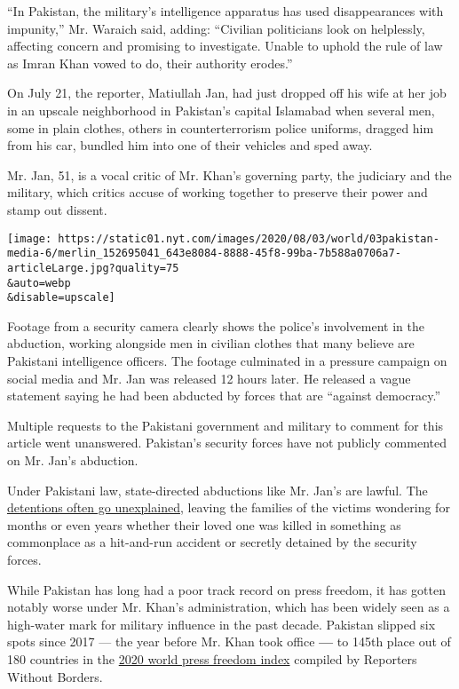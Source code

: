 ``In Pakistan, the military's intelligence apparatus has used
disappearances with impunity,'' Mr. Waraich said, adding: ``Civilian
politicians look on helplessly, affecting concern and promising to
investigate. Unable to uphold the rule of law as Imran Khan vowed to do,
their authority erodes.''

On July 21, the reporter, Matiullah Jan, had just dropped off his wife
at her job in an upscale neighborhood in Pakistan's capital Islamabad
when several men, some in plain clothes, others in counterterrorism
police uniforms, dragged him from his car, bundled him into one of their
vehicles and sped away.

Mr. Jan, 51, is a vocal critic of Mr. Khan's governing party, the
judiciary and the military, which critics accuse of working together to
preserve their power and stamp out dissent.

\texttt{[image: https://static01.nyt.com/images/2020/08/03/world/03pakistan-media-6/merlin\_152695041\_643e8084-8888-45f8-99ba-7b588a0706a7-articleLarge.jpg?quality=75\\\&auto=webp\\\&disable=upscale]}

Footage from a security camera clearly shows the police's involvement in
the abduction, working alongside men in civilian clothes that many
believe are Pakistani intelligence officers. The footage culminated in a
pressure campaign on social media and Mr. Jan was released 12 hours
later. He released a vague statement saying he had been abducted by
forces that are ``against democracy.''

Multiple requests to the Pakistani government and military to comment
for this article went unanswered. Pakistan's security forces have not
publicly commented on Mr. Jan's abduction.

Under Pakistani law, state-directed abductions like Mr. Jan's are
lawful. The
\href{https://www.nytimes.com/2007/01/14/world/asia/14pakistan.html}{detentions
often go unexplained}, leaving the families of the victims wondering for
months or even years whether their loved one was killed in something as
commonplace as a hit-and-run accident or secretly detained by the
security forces.

While Pakistan has long had a poor track record on press freedom, it has
gotten notably worse under Mr. Khan's administration, which has been
widely seen as a high-water mark for military influence in the past
decade. Pakistan slipped six spots since 2017 --- the year before Mr.
Khan took office \textbf{---} to 145th place out of 180 countries in the
\href{https://rsf.org/en/pakistan}{2020 world press freedom index}
compiled by Reporters Without Borders.

